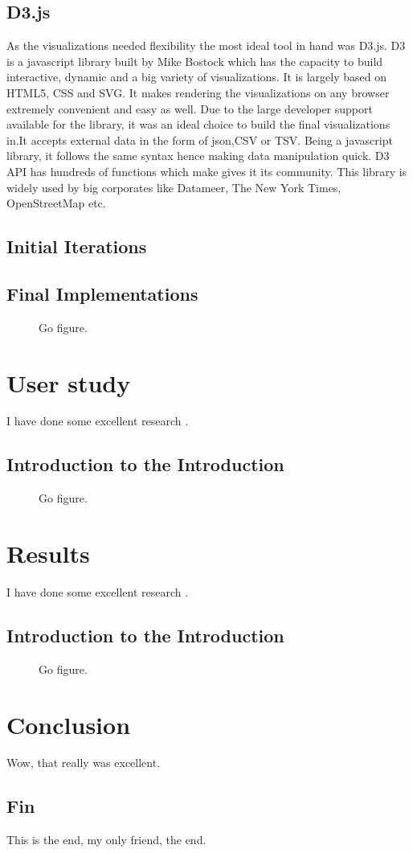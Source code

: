 \documentclass[double,12pt]{beavtex}
\begin{document}
\section{D3.js}
As the visualizations needed flexibility the most ideal tool in hand was D3.js. D3 is a javascript library built by Mike Bostock which has the capacity to build interactive, dynamic and a big variety of visualizations. It is largely based on HTML5, CSS and SVG. It makes rendering the visualizations on any browser extremely convenient and easy as well. Due to the large developer support available for the library, it was an ideal choice to build the final visualizations in.It accepts external data in the form of json,CSV or TSV. Being a javascript library, it follows the same syntax hence making data manipulation quick. D3 API has hundreds of functions which make gives it its community. This library is widely used by big corporates like Datameer, The New York Times, OpenStreetMap etc.

\section{Initial Iterations}

\section{Final Implementations}

\begin{figure}[!ht]
\centering
{}
\caption{Go figure.}
\end{figure}

\chapter{User study}
I have done some excellent research \cite{matrix}.
\section{Introduction to the Introduction}
\begin{figure}[!ht]
\centering
{}
\caption{Go figure.}
\end{figure}

\chapter{Results}
I have done some excellent research \cite{matrix}.
\section{Introduction to the Introduction}
\begin{figure}[!ht]
\centering
{}
\caption{Go figure.}
\end{figure}

\chapter{Conclusion}
Wow, that really was excellent.
\section{Fin}
This is the end, my only friend, the end.




\end{document}

